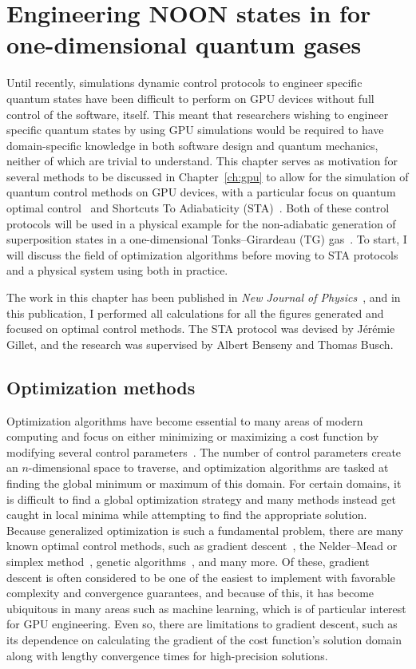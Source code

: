 \chapter{Engineering NOON states in for one-dimensional quantum gases}
\label{ch:1d}

Until recently, simulations dynamic control protocols to engineer specific quantum states have been difficult to perform on GPU devices without full control of the software, itself.
This meant that researchers wishing to engineer specific quantum states by using GPU simulations would be required to have domain-specific knowledge in both software design and quantum mechanics, neither of which are trivial to understand.
This chapter serves as motivation for several methods to be discussed in Chapter~\ref{ch:gpu} to allow for the simulation of quantum control methods on GPU devices, with a particular focus on quantum optimal control~\cite{werschnik2007} and Shortcuts To Adiabaticity (STA)~\cite{guery2019}.
Both of these control protocols will be used in a physical example for the non-adiabatic generation of superposition states in a one-dimensional Tonks--Girardeau (TG) gas~\cite{schloss2016}.
To start, I will discuss the field of optimization algorithms before moving to STA protocols and a physical system using both in practice.

The work in this chapter has been published in \textit{New Journal of Physics}~\cite{schloss2016}, and in this publication, I performed all calculations for all the figures generated and focused on optimal control methods.
The STA protocol was devised by J\'er\'emie Gillet, and the research was supervised by Albert Benseny and Thomas Busch.

\section{Optimization methods}

Optimization algorithms have become essential to many areas of modern computing and focus on either minimizing or maximizing a cost function by modifying several control parameters~\cite{lewis2012}.
The number of control parameters create an $n$-dimensional space to traverse, and optimization algorithms are tasked at finding the global minimum or maximum of this domain.
For certain domains, it is difficult to find a global optimization strategy and many methods instead get caught in local minima while attempting to find the appropriate solution.
Because generalized optimization is such a fundamental problem, there are many known optimal control methods, such as gradient descent~\cite{ruder2016}, the Nelder--Mead or simplex method~\cite{nelder1965}, genetic algorithms~\cite{koza1997}, and many more.
Of these, gradient descent is often considered to be one of the easiest to implement with favorable complexity and convergence guarantees, and because of this, it has become ubiquitous in many areas such as machine learning, which is of particular interest for GPU engineering. 
Even so, there are limitations to gradient descent, such as its dependence on calculating the gradient of the cost function's solution domain along with lengthy convergence times for high-precision solutions.

